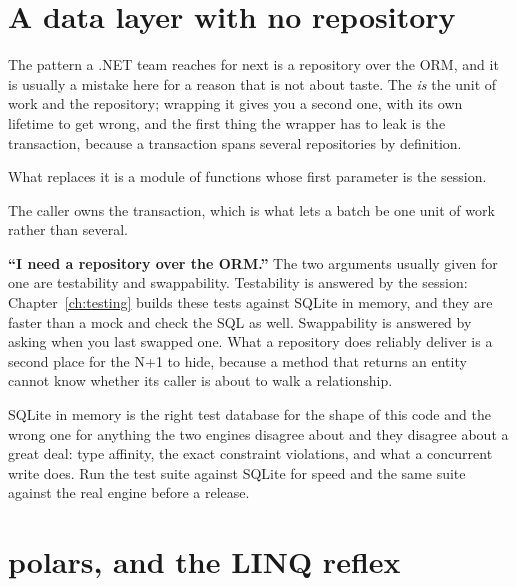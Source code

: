 \section{A data layer with no repository}
\label{sec:ch10-no-repository}

The pattern a .NET team reaches for next is a repository over the ORM, and
it is usually a mistake here for a reason that is not about taste. The
 \emph{is} the unit of work and the repository; wrapping it
gives you a second one, with its own lifetime to get wrong, and the first
thing the wrapper has to leak is the transaction, because a transaction
spans several repositories by definition.

What replaces it is a module of functions whose first parameter is the
session.


\noindent
The caller owns the transaction, which is what lets a batch be one unit of
work rather than several.


\begin{trapbox}
\textbf{\enquote{I need a repository over the ORM.}} The two arguments
usually given for one are testability and swappability. Testability is
answered by the session: Chapter~\ref{ch:testing} builds these tests against
SQLite in memory, and they are faster than a mock and check the SQL as well.
Swappability is answered by asking when you last swapped one. What a
repository does reliably deliver is a second place for the N+1 to hide,
because a method that returns an entity cannot know whether its caller is
about to walk a relationship.
\end{trapbox}

\begin{note}
SQLite in memory is the right test database for the shape of this code and
the wrong one for anything the two engines disagree about \dash{} and they
disagree about a great deal: type affinity, the exact constraint violations,
and what a concurrent write does. Run the test suite against SQLite for
speed and the same suite against the real engine before a release.
\end{note}

\section{polars, and the LINQ reflex}
\label{sec:ch10-polars}

